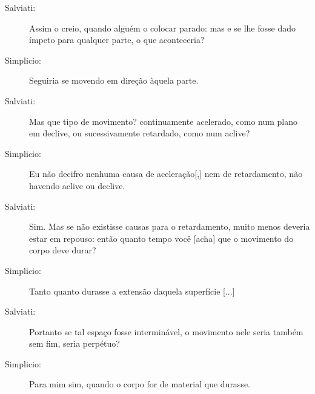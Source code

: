 \begin{description}
\item[Salviati:] Assim o creio, quando alguém o colocar parado: mas e se lhe fosse dado ímpeto para qualquer parte, o que aconteceria?

\item[Simplicio:] Seguiria se movendo em direção àquela parte.

\item[Salviati:] Mas que tipo de movimento? continuamente acelerado, como num plano em declive, ou sucessivamente retardado, como num aclive?

\item[Simplicio:] Eu não decifro nenhuma causa de aceleração[,] nem de retardamento, não havendo aclive ou declive.

\item[Salviati:] Sim. Mas se não existisse causas para o retardamento, muito menos deveria estar em repouso: então quanto tempo você [acha] que o movimento do corpo deve durar?

\item[Simplicio:] Tanto quanto durasse a extensão daquela superfície [...]

\item[Salviati:] Portanto se tal espaço fosse interminável, o movimento nele seria também sem fim, seria perpétuo?

\item[Simplicio:] Para mim sim, quando o corpo for de material que durasse.


\end{description}
